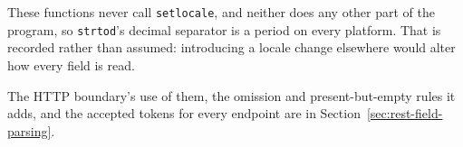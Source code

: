 These functions never call \texttt{setlocale}, and neither does any other part
of the program, so \texttt{strtod}'s decimal separator is a period on every
platform.  That is recorded rather than assumed: introducing a locale change
elsewhere would alter how every field is read.

The HTTP boundary's use of them, the omission and present-but-empty rules it
adds, and the accepted tokens for every endpoint are in
Section~\ref{sec:rest-field-parsing}.

\endgroup
